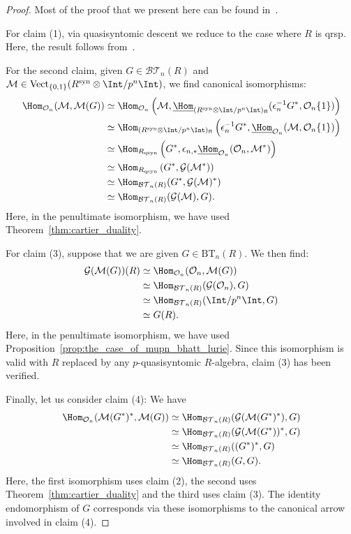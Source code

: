 \documentclass[10pt]{amsart}
\begin{document}
\begin{proof}
Most of the proof that we present here can be found in~\cite[\S 3]{Mondal2024-cy}. 

For claim (1), via quasisyntomic descent we reduce to the case where $R$ is qrsp. Here, the result follows from~\cite[Props. 3.56, 3.80, 3.81]{Mondal2024-cy}.

For the second claim, given $G\in \mathcal{BT}_n(R)$ and $\mathcal{M}\in \mathrm{Vect}_{\{0,1\}}(R^{\mathrm{syn}}\otimes\Int/p^n\Int) $, we find canonical isomorphisms:
\begin{align*}
\Hom_{\mathcal{O}_n}(\mathcal{M},\mathcal{M}(G))&\simeq  \Hom_{\mathcal{O}_n}\left(\mathcal{M},\underline{\Hom}_{(R^{\mathrm{syn}}\otimes\Int/p^n\Int)_{\mathrm{fl}}}(\epsilon_n^{-1}G^*,\mathcal{O}_n\{1\})\right)\\
&\simeq\Hom_{(R^{\mathrm{syn}}\otimes\Int/p^n\Int)_{\mathrm{fl}}}\left(\epsilon_n^{-1}G^*,\underline{\Hom}_{\mathcal{O}_n}(\mathcal{M},\mathcal{O}_n\{1\})\right)\\
&\simeq\Hom_{R_{\mathrm{qsyn}}}\left(G^*,\epsilon_{n,*}\underline{\Hom}_{\mathcal{O}_n}(\mathcal{O}_n,\mathcal{M}^*)\right)\\
&\simeq\Hom_{R_{\mathrm{qsyn}}}\left(G^*,\mathcal{G}(\mathcal{M}^*)\right)\\
&\simeq\Hom_{\mathcal{BT}_n(R)}(G^*,\mathcal{G}(\mathcal{M})^*) \\
&\simeq\Hom_{\mathcal{BT}_n(R)}(\mathcal{G}(\mathcal{M}),G).
 \end{align*}
Here, in the penultimate isomorphism, we have used Theorem~\ref{thm:cartier_duality}.

For claim (3), suppose that we are given $G\in \mathrm{BT}_n(R)$. We then find:
\begin{align*}
\mathcal{G}(\mathcal{M}(G))(R)&\simeq \Hom_{\mathcal{O}_n}(\mathcal{O}_n,\mathcal{M}(G))\\
&\simeq\Hom_{\mathcal{BT}_n(R)}(\mathcal{G}(\mathcal{O}_n),G)\\
&\simeq\Hom_{\mathcal{BT}_n(R)}(\Int/p^n\Int,G)\\
&\simeq G(R).
\end{align*}
Here, in the penultimate isomorphism, we have used Proposition~\ref{prop:the_case_of_mupn_bhatt_lurie}. Since this isomorphism is valid with $R$ replaced by any $p$-quasisyntomic $R$-algebra, claim (3) has been verified.

Finally, let us consider claim (4): We have
\begin{align*}
\Hom_{\mathcal{O}_n}(\mathcal{M}(G^*)^*,\mathcal{M}(G))&\simeq \Hom_{\mathcal{BT}_n(R)}(\mathcal{G}(\mathcal{M}(G^*)^*),G)\\
&\simeq \Hom_{\mathcal{BT}_n(R)}(\mathcal{G}(\mathcal{M}(G^*))^*,G)\\
&\simeq \Hom_{\mathcal{BT}_n(R)}((G^*)^*,G)\\
&\simeq \Hom_{\mathcal{BT}_n(R)}(G,G).
\end{align*}
Here, the first isomorphism uses claim (2), the second uses Theorem~\ref{thm:cartier_duality} and the third uses claim (3). The identity endomorphism of $G$ corresponds via these isomorphisms to the canonical arrow involved in claim (4).


\end{proof}
\end{document}
